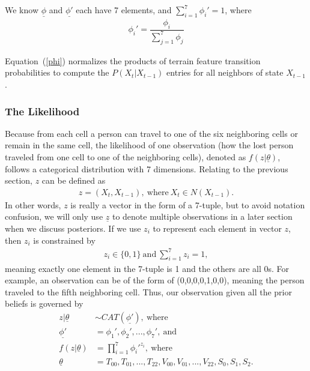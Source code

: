 We know $\underline{\phi}$ and $\underline{\phi'}$ each have 7 elements, and $\sum_{i=1}^7 \phi_i' = 1$, where
\begin{align}
\label{phi}
\phi_i' = \dfrac{\phi_i}{\sum_{j=1}^7 \phi_j}
\end{align}

Equation~(\ref{phi}) normalizes the products of terrain feature transition probabilities to compute the $P(X_t|X_{t-1})$ entries for all neighbors of state $X_{t-1}$.

\subsubsection{The Likelihood}
\label{sec:3.4.3}

Because from each cell a person can travel to one of the six neighboring cells or remain in the same cell, the likelihood of one observation (how the lost person traveled from one cell to one of the neighboring cells), denoted as $f(z|\underline{\theta})$, follows a categorical distribution with 7 dimensions. Relating to the previous section, $z$ can be defined as
\begin{align}
z = (X_t, X_{t-1}), ~\mathrm{where}~ X_t \in N(X_{t-1}).
\end{align}
In other words, $z$ is really a vector in the form of a 7-tuple, but to avoid notation confusion, we will only use $\underline{z}$ to denote multiple observations in a later section when we discuss posteriors. If we use $z_i$ to represent each element in vector $z$, then $z_i$ is constrained by
\begin{align}
\label{}
z_i \in \{0,1\} ~\mathrm{and}~ \sum_{i=1}^7 z_i=1,
\end{align}
meaning exactly one element in the 7-tuple is 1 and the others are all 0s. For example, an observation can be of the form of (0,0,0,0,1,0,0), meaning the person traveled to the fifth neighboring cell. Thus, our observation given all the prior beliefs is governed by
\begin{align}
\label{CAT}
z|\underline{\theta} &\sim CAT(\underline{\phi'}), ~\mathrm{where}\\
\underline{\phi'} &= \phi_1', \phi_2', ..., \phi_7', ~\mathrm{and}\\
\label{likelihood}
f(z|\underline{\theta}) &= \prod_{i=1}^7 \phi_i'^{z_i},~\mathrm{where}\\
\underline{\theta} &= T_{00},T_{01},...,T_{22},V_{00},V_{01},...,V_{22},S_0,S_1,S_2.
\end{align}

